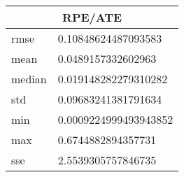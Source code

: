 \begin{table}[!ht] 
 \centering 
 \begin{tabular}{|l|l|} \hline 
 \multicolumn{2}{|c|}{RPE/ATE} \\ \hline 
 rmse & 0.10848624487093583 \\ \hline 
mean & 0.0489157332602963 \\ \hline 
median & 0.019148282279310282 \\ \hline 
std & 0.09683241381791634 \\ \hline 
min & 0.0009224999493943852 \\ \hline 
max & 0.6744882894357731 \\ \hline 
sse & 2.5539305757846735 \\ \hline 
\end{tabular} 
 \end{table}
